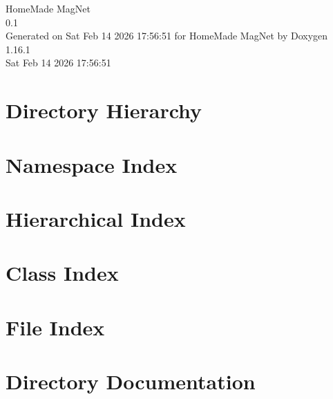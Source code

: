 \documentclass[twoside]{book}
\newcommand{\+}{\discretionary{\mbox{\scriptsize$\hookleftarrow$}}{}{}}
\newcommand{\clearemptydoublepage}{%
    \newpage{\pagestyle{empty}\cleardoublepage}%
  }
\begin{document}
  \raggedbottom
    \hypersetup{pageanchor=false,
                bookmarksnumbered=true,
                pdfencoding=unicode
               }
  \begin{titlepage}
  \vspace*{7cm}
  \begin{center}%
  {\Large Home\+Made Mag\+Net}\\
  [1ex]\large 0.\+1 \\
  \vspace*{1cm}
  {\large Generated on Sat Feb 14 2026 17:\+56:\+51 for Home\+Made Mag\+Net by Doxygen 1.16.1}\\
    \vspace*{0.5cm}
    {\small Sat Feb 14 2026 17:56:51}
  \end{center}
  \end{titlepage}
  \clearemptydoublepage
  \tableofcontents
  \clearemptydoublepage
  \hypersetup{pageanchor=true}
\chapter{Directory Hierarchy}

\chapter{Namespace Index}

\chapter{Hierarchical Index}

\chapter{Class Index}

\chapter{File Index}

\chapter{Directory Documentation}





\end{document}
